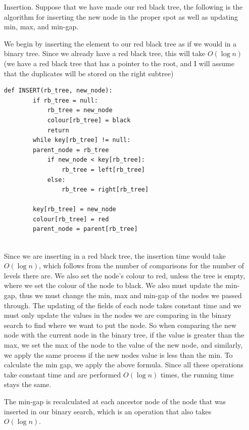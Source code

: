 \documentclass[12pt]{article}
\theoremstyle{definition}
\theoremstyle{remark}
\begin{document}
\begin{enumerate}
    
\begin{enumerate}
\item[\sc Insertion.] Suppose that we have made our red black tree, the following is the algorithm for inserting the new node in the proper spot as well as updating min, max, and min-gap. 

We begin by inserting the element to our red black tree as if we would in a binary tree. Since we already have a red black tree, this will take $O(\log n)$ (we have a red black tree that has a pointer to the root, and I will assume that the duplicates will be stored on the right subtree)

\begin{lstlisting}[caption = Inserting in a balanced binary tree]
    def INSERT(rb_tree, new_node):
        if rb_tree = null:
            rb_tree = new_node
            colour[rb_tree] = black
            return 
        while key[rb_tree] != null:
        parent_node = rb_tree
            if new_node < key[rb_tree]:
                rb_tree = left[rb_tree]
            else:
                rb_tree = right[rb_tree] 

        key[rb_tree] = new_node
        colour[rb_tree] = red
        parent_node = parent[rb_tree]
        
\end{lstlisting}

Since we are inserting in a red black tree, the insertion time would take $O(\log n)$, which follows from the number of comparisons for the number of levels there are. We also set the node's colour to red, unless the tree is empty, where we set the colour of the node to black. We also must update the min-gap, thus we must change the min, max and min-gap of the nodes we passed through. The updating of the fields of each node takes constant time and we must only update the values in the nodes we are comparing in the binary search to find where we want to put the node. So when comparing the new node with the current node in the binary tree, if the value is greater than the max, we set the max of the node to the value of the new node, and similarly, we apply the same process if the new nodes value is less than the min. To calculate the min gap, we apply the above formula. Since all these operations take constant time and are performed $O(\log n)$ times, the running time stays the same. 

The min-gap is recalculated at each ancestor node of the node that was inserted in our binary search, which is an operation that also takes $O(\log n)$. 


\end{enumerate}
\end{enumerate}
\end{document}
